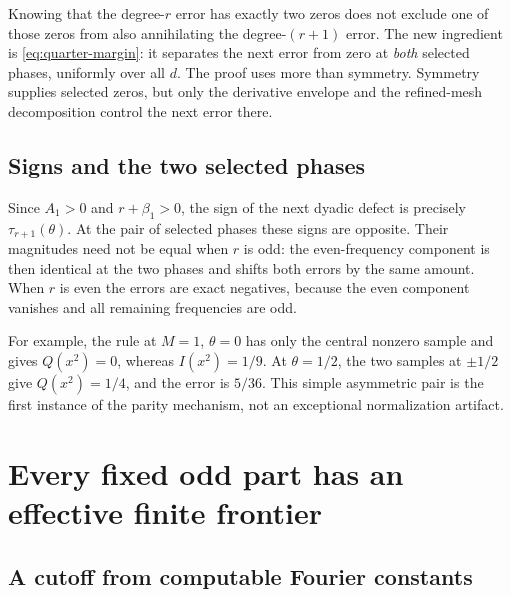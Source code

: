\documentclass[11pt,a4paper]{article}
\numberwithin{equation}{section}
\theoremstyle{plain}
\theoremstyle{definition}
\theoremstyle{remark}
\begin{document}
Knowing that the degree-$r$ error has exactly two zeros does not exclude
one of those zeros from also annihilating the degree-$(r+1)$ error.
The new ingredient is \eqref{eq:quarter-margin}: it separates the next
error from zero at \emph{both} selected phases, uniformly over all $d$.
The proof uses more than symmetry. Symmetry supplies selected zeros, but
only the derivative envelope and the refined-mesh decomposition control
the next error there.

\subsection{Signs and the two selected phases}

Since $A_1>0$ and $r+\beta_1>0$, the sign of the next dyadic defect is
precisely $\tau_{r+1}(\theta)$. At the pair of selected phases these
signs are opposite. Their magnitudes need not be equal when $r$ is odd:
the even-frequency component is then identical at the two phases and
shifts both errors by the same amount. When $r$ is even the errors are
exact negatives, because the even component vanishes and all remaining
frequencies are odd.

For example, the rule at $M=1$, $\theta=0$ has only the central nonzero
sample and gives $Q(x^2)=0$, whereas $I(x^2)=1/9$. At $\theta=1/2$,
the two samples at $\pm1/2$ give $Q(x^2)=1/4$, and the error is $5/36$.
This simple asymmetric pair is the first instance of the parity mechanism,
not an exceptional normalization artifact.

\section{Every fixed odd part has an effective finite frontier}
\label{sec:eventual}

\subsection{A cutoff from computable Fourier constants}
\end{document}
